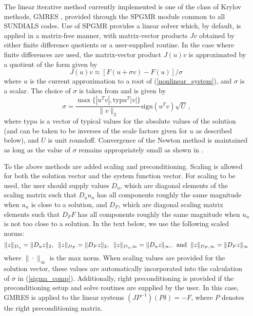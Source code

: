 The linear iterative method currently implemented is one of the
class of Krylov methods, GMRES \cite{BrHi:89,SaSc:86}, provided
through the SPGMR module common to all SUNDIALS codes. Use of
SPGMR provides a linear solver which, by default, is applied in a
matrix-free manner, with matrix-vector products $Jv$ obtained by
either finite difference quotients or a user-supplied routine. In
the case where finite differences are used, the matrix-vector
product $J(u)v$ is approximated by a quotient of the form given by
\begin{equation}\label{jacobv}
J(u) v \approx [F(u+\sigma v) - F(u)]/\sigma \,
\end{equation}
where $u$ is the current approximation to a root of
(\ref{nonlinear_system}), and $\sigma$ is a scalar. The choice of
$\sigma$ is taken from \cite{BrSa:90} and is given by
\begin{equation}\label{sigma_comp}
  \sigma = \frac{\max \{|u^T v|, \mbox{typ}u^T |v|\}}{\|v\|_2}
  \mbox{sign}(u^T v) \sqrt{U} \, ,
\end{equation}
where $\mbox{typ}u$ is a vector of typical values for the absolute
values of the solution (and can be taken to be inverses of the
scale factors given for $u$ as described below), and $U$ is unit
roundoff. Convergence of the Newton method is maintained as long
as the value of $\sigma$ remains appropriately small as shown in
\cite{Bro:87}.

To the above methods are added scaling and preconditioning.
Scaling is allowed for both the solution vector and the system
function vector. For scaling to be used, the user should supply
values $D_u$, which are diagonal elements of the scaling matrix
such that $D_u u_n$ has all components roughly the same magnitude
when $u_n$ is close to a solution, and $D_F$, which are diagonal
scaling matrix elements such that $D_F F$ has all components
roughly the same magnitude when $u_n$ is not too close to a
solution. In the text below, we use the following scaled norms:
\begin{equation}
\|z\|_{D_u} = \|D_u z\|_2, \;\; \|z\|_{D_F} = \|D_F z\|_2, \;\;
\|z\|_{D_u,\infty} = \|D_u z\|_{\infty}, \;\; {\rm and} \;\;
\|z\|_{D_F,\infty} = \|D_F z\|_{\infty}
\end{equation}
where $\| \cdot \|_{\infty}$ is the max norm.  When scaling values
are provided for the solution vector, these values are
automatically incorporated into the calculation of $\sigma$ in
(\ref{sigma_comp}). Additionally, right preconditioning is
provided if the preconditioning setup and solve routines are
supplied by the user. In this case, GMRES is applied to the linear
systems $(JP^{-1})(P\delta) = -F$, where $P$ denotes the right
preconditioning matrix.

